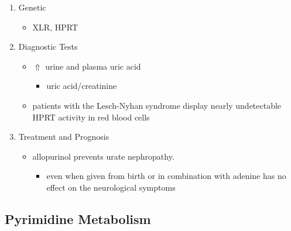 \documentclass{scrartcl}
\begin{document}
\begin{enumerate}
\item Genetic
\label{sec:org40c228b}
\begin{itemize}
\item XLR, HPRT
\end{itemize}

\item Diagnostic Tests
\label{sec:org2469770}
\begin{itemize}
\item \(\Uparrow\) urine and plasma uric acid
\begin{itemize}
\item uric acid/creatinine
\end{itemize}
\item patients with the Lesch-Nyhan syndrome display nearly undetectable
HPRT activity in red blood cells
\end{itemize}

\item Treatment and Prognosis
\label{sec:org1a6e0e3}
\begin{itemize}
\item allopurinol prevents urate nephropathy.
\begin{itemize}
\item even when given from birth or in combination with adenine has no
effect on the neurological symptoms
\end{itemize}
\end{itemize}
\end{enumerate}

\subsection{Pyrimidine Metabolism}
\label{sec:orgb545799}
\end{document}
